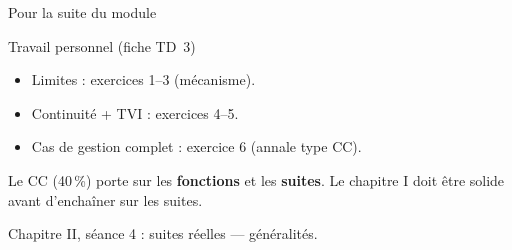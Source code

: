 \documentclass[10pt,aspectratio=169]{beamer}
\numberwithin{dummy}{section}
\begin{document}
\begin{frame}{Pour la suite du module}
\begin{block}{Travail personnel (fiche TD~3)}
\begin{itemize}
    \item Limites : exercices 1--3 (mécanisme).
    \item Continuité + TVI : exercices 4--5.
    \item Cas de gestion complet : exercice 6 (annale type CC).
\end{itemize}
\end{block}

\vspace{0.4em}
\begin{boxattention}
Le CC (40\,\%) porte sur les \textbf{fonctions} et les \textbf{suites}.
Le chapitre I doit être solide avant d'enchaîner sur les suites.
\end{boxattention}

\vspace{0.3em}
\centering
{\large Chapitre II, séance 4 : suites réelles --- généralités.}
\end{frame}
\end{document}
